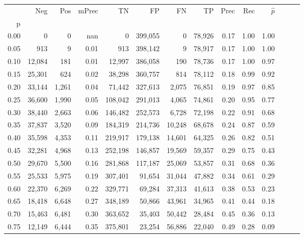 \begin{tabular}{rrrrrrrrrrrrrr}
\toprule
{} &     Neg &    Pos & mPrec &       TN &       FP &      FN &      TP &  Prec &   Rec & $\hat{p}$ \\
p    &         &        &       &          &          &         &         &       &       &           \\
\midrule
0.00 &       0 &      0 &   nan &        0 &  399,055 &       0 &  78,926 &  0.17 &  1.00 &      1.00 \\
0.05 &     913 &      9 &  0.01 &      913 &  398,142 &       9 &  78,917 &  0.17 &  1.00 &      1.00 \\
0.10 &  12,084 &    181 &  0.01 &   12,997 &  386,058 &     190 &  78,736 &  0.17 &  1.00 &      0.97 \\
0.15 &  25,301 &    624 &  0.02 &   38,298 &  360,757 &     814 &  78,112 &  0.18 &  0.99 &      0.92 \\
0.20 &  33,144 &  1,261 &  0.04 &   71,442 &  327,613 &   2,075 &  76,851 &  0.19 &  0.97 &      0.85 \\
0.25 &  36,600 &  1,990 &  0.05 &  108,042 &  291,013 &   4,065 &  74,861 &  0.20 &  0.95 &      0.77 \\
0.30 &  38,440 &  2,663 &  0.06 &  146,482 &  252,573 &   6,728 &  72,198 &  0.22 &  0.91 &      0.68 \\
0.35 &  37,837 &  3,520 &  0.09 &  184,319 &  214,736 &  10,248 &  68,678 &  0.24 &  0.87 &      0.59 \\
0.40 &  35,598 &  4,353 &  0.11 &  219,917 &  179,138 &  14,601 &  64,325 &  0.26 &  0.82 &      0.51 \\
0.45 &  32,281 &  4,968 &  0.13 &  252,198 &  146,857 &  19,569 &  59,357 &  0.29 &  0.75 &      0.43 \\
0.50 &  29,670 &  5,500 &  0.16 &  281,868 &  117,187 &  25,069 &  53,857 &  0.31 &  0.68 &      0.36 \\
0.55 &  25,533 &  5,975 &  0.19 &  307,401 &   91,654 &  31,044 &  47,882 &  0.34 &  0.61 &      0.29 \\
0.60 &  22,370 &  6,269 &  0.22 &  329,771 &   69,284 &  37,313 &  41,613 &  0.38 &  0.53 &      0.23 \\
0.65 &  18,418 &  6,648 &  0.27 &  348,189 &   50,866 &  43,961 &  34,965 &  0.41 &  0.44 &      0.18 \\
0.70 &  15,463 &  6,481 &  0.30 &  363,652 &   35,403 &  50,442 &  28,484 &  0.45 &  0.36 &      0.13 \\
0.75 &  12,149 &  6,444 &  0.35 &  375,801 &   23,254 &  56,886 &  22,040 &  0.49 &  0.28 &      0.09 \\

\end{tabular}

